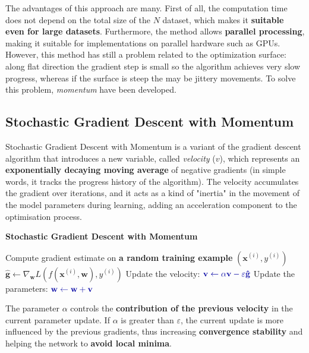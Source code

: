 The advantages of this approach are many. First of all, the computation time does not depend on the total size of the $N$ dataset, which makes it \textbf{suitable even for large datasets}. Furthermore, the method allows \textbf{parallel processing}, making it suitable for implementations on parallel hardware such as GPUs. However, this method has still a problem related to the optimization surface: along flat direction the gradient step is small so the algorithm achieves very slow progress, whereas if the surface is steep the may be jittery movements.  To solve this problem, \textit{momentum} have been developed.

\subsection{Stochastic Gradient Descent with Momentum}
Stochastic Gradient Descent with Momentum is a variant of the gradient descent algorithm that introduces a new variable, called \textit{velocity} (\(v\)), which represents an \textbf{exponentially decaying moving average} of negative gradients (in simple words, it tracks the progress history of the algorithm). The velocity accumulates the gradient over iterations, and it acts as a kind of "inertia" in the movement of the model parameters during learning, adding an acceleration component to the optimisation process.

\begin{algorithm}
\renewcommand\thealgorithm{}
\caption{\textbf{\textcolor{mygreen}{Stochastic Gradient Descent with Momentum}}}
\begin{algorithmic}[1]
    \STATE Compute gradient estimate on \textbf{\textcolor{myred}{a random training example}} $(\mathbf{x}^{(i)}, y^{(i)})$
    \STATE 
    $
    \mathbf{\hat{g}} \leftarrow\nabla_{\mathbf{w}} L(f(\mathbf{x}^{(i)},\mathbf{w}), y^{(i)})
    $
    \STATE Update the velocity:
    $\textcolor{mybluee}{\mathbf{v} \leftarrow \alpha \mathbf{v} - \varepsilon \mathbf{\hat{g}}}$
    \STATE Update the parameters:
    $\textcolor{mybluee}{\mathbf{w} \leftarrow \mathbf{w} + \mathbf{v}}$
\ENDWHILE
\end{algorithmic}
\end{algorithm}

The parameter \(\alpha\) controls the \textbf{\textcolor{mybluee}{contribution of the previous velocity}} in the current parameter update. If \(\alpha\) is greater than \(\varepsilon\), the current update is more influenced by the previous gradients, thus increasing \textbf{convergence stability} and helping the network to \textbf{avoid local minima}. 

